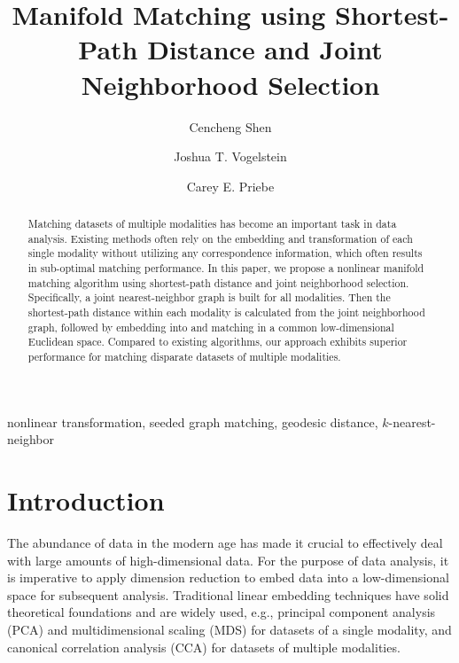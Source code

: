 \documentclass[times,twocolumn,final]{elsarticle}
\begin{document}
\begin{frontmatter}
\title{Manifold Matching using Shortest-Path Distance and Joint Neighborhood Selection}
\author[1,2]{Cencheng Shen}
\author[1,3]{Joshua T. Vogelstein}
\author[1,4]{Carey E. Priebe}

\address[1]{Center for Imaging Science, Johns Hopkins University}
\address[2]{Department of Statistics, Temple University}
\address[3]{Department of Biomedical Engineering and Institute for Computational Medicine, Johns Hopkins University}
\address[4]{Department of Applied Mathematics and Statistics, Johns Hopkins University}

\begin{abstract}
Matching datasets of multiple modalities has become an important task in data analysis. Existing methods often rely on the embedding and transformation of each single modality without utilizing any correspondence information, which often results in sub-optimal matching performance. In this paper, we propose a nonlinear manifold matching algorithm using shortest-path distance and joint neighborhood selection. Specifically, a joint nearest-neighbor graph is built for all modalities. Then the shortest-path distance within each modality is calculated from the joint neighborhood graph, followed by embedding into and matching in a common low-dimensional Euclidean space. Compared to existing algorithms, our approach exhibits superior performance for matching disparate datasets of multiple modalities. 
\end{abstract}
\begin{keyword}
nonlinear transformation, seeded graph matching, geodesic distance, $k$-nearest-neighbor
\end{keyword}
\end{frontmatter}

\section{Introduction}
The abundance of data in the modern age has made it crucial to effectively deal with large amounts of high-dimensional data. For the purpose of data analysis, it is imperative to apply dimension reduction to embed data into a low-dimensional space for subsequent analysis. Traditional linear embedding techniques have solid theoretical foundations and are widely used, e.g., principal component analysis (PCA) \citep{JolliffePCABook, BishopTipping1999} and multidimensional scaling (MDS) \citep{TorgersonBook, BorgBook, CoxBook} for datasets of a single modality, and canonical correlation analysis (CCA) \citep{Hotelling1936, BachJordan2005} for datasets of multiple modalities. 
\end{document}
